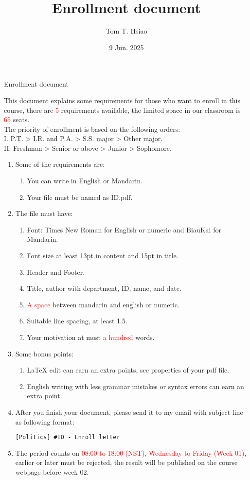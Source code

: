 \documentclass{article}
\title{Enrollment document}
\author{Tom T. Hsiao}
\date{9 Jun. 2025}
\begin{document}
\thispagestyle{fancy}
\begin{center}
\fontsize{16pt}{16pt}\selectfont Enrollment document
\end{center}
\fontsize{14pt}{14pt}\selectfont
This document explains some requirements for those who want to enroll in this course, there are \textcolor{red}{5} requirements available, the limited space in our classroom is \textcolor{red}{65} seats. \\
The priority of enrollment is based on the following orders: \\
I. P.T. > I.R. and P.A. > S.S. major > Other major. \\
II. Freshman > Senior or above > Junior > Sophomore. 
\begin{enumerate}
\item Some of the requirements are:
\begin{enumerate}
\item You can write in English or Mandarin.
\item Your file must be named as ID.pdf.
\end{enumerate}
\item The file must have:
\begin{enumerate}
\item Font: Times New Roman for English or numeric and BiauKai for Mandarin.
\item Font size at least 13pt in content and 15pt in title.
\item Header and Footer.
\item Title, author with department, ID, name, and date.
\item \textcolor{red}{A space} between mandarin and english or numeric.
\item Suitable line spacing, at least 1.5.
\item Your motivation at most \textcolor{red}{a hundred} words.
\end{enumerate}
\item Some bonus points:
\begin{enumerate}
\item LaTeX edit can earn an extra points, see properties of your pdf file.
\item English writing with less grammar mistakes or syntax errors can earn an extra point.
\end{enumerate}
\item After you finish your document, please send it to my email with subject line as following format:
\begin{verbatim}
[Politics] #ID - Enroll letter
\end{verbatim}
\item The period counts on \textcolor{red}{08:00 to 18:00 (NST), Wednesday to Friday (Week 01)}, earlier or later must be rejected, the result will be published on the course webpage before week 02.
\end{enumerate}
\end{document}
